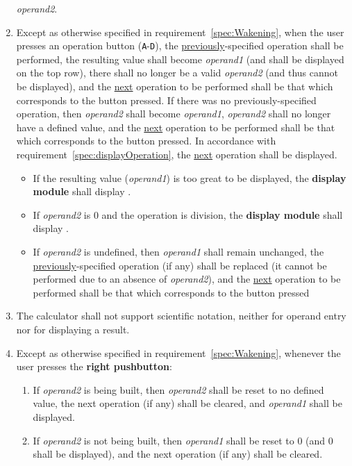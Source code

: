 \begin{enumerate}
    \textit{operand2}.
\item Except as otherwise specified in requirement~\ref{spec:Wakening}, when
    the user presses an operation button (\texttt{A}-\texttt{D}), the
    \underline{previously}-specified operation shall be performed, the
    resulting value shall become \textit{operand1} (and shall be displayed on the top row),
    there shall no longer be a valid \textit{operand2} (and thus cannot be displayed), and the \underline{next} operation
    to be performed shall be that which corresponds to the button pressed. If
    there was no previously-specified operation, then \textit{operand2} shall
    become \textit{operand1}, \textit{operand2} shall no longer have a defined
    value, and the \underline{next} operation to be performed shall be that
    which corresponds to the button pressed. In accordance with requirement~\ref{spec:displayOperation}, the \underline{next} operation shall be displayed.
    \begin{itemize}
    \item If the resulting value (\textit{operand1}) is too great to be
        displayed, the \textbf{display module} shall display
        .
    \item If \textit{operand2} is 0 and the operation is division, the
        \textbf{display module} shall display .
    \item If \textit{operand2} is undefined, then \textit{operand1} shall remain unchanged, the \underline{previously}-specified operation (if any) shall be replaced (it cannot be performed due to an absence of \textit{operand2}), and the \underline{next} operation to be performed shall be that which corresponds to the button pressed
    \end{itemize}
\item The calculator shall not support scientific notation, neither for operand
    entry nor for displaying a result.
\item Except as otherwise specified in requirement~\ref{spec:Wakening},
    whenever the user presses the \textbf{right pushbutton}:
    \begin{enumerate}
    \item If \textit{operand2} is being built, then \textit{operand2} shall be
        reset to no defined value, the next operation (if any) shall be
        cleared, and \textit{operand1} shall be displayed.
    \item If \textit{operand2} is not being built, then \textit{operand1} shall
        be reset to 0 (and 0 shall be displayed), and the next operation (if
        any) shall be cleared.
    \end{enumerate}


\end{enumerate}
